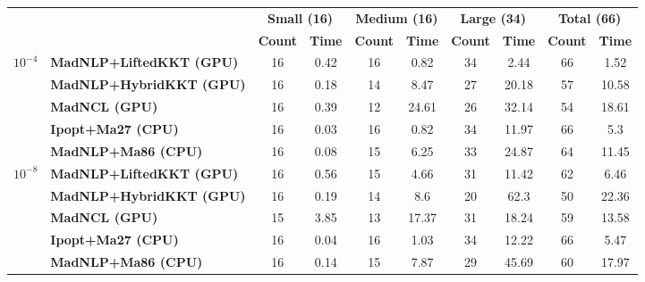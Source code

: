 \begin{center}
\renewcommand{\arraystretch}{0.9}
\begin{tabular}{|l|l|cc|cc|cc|cc|}
\hline
 & & \multicolumn{2}{c|}{\textbf{Small (16)}} & \multicolumn{2}{c|}{\textbf{Medium (16)}} & \multicolumn{2}{c|}{\textbf{Large (34)}} & \multicolumn{2}{c|}{\textbf{Total (66)}} \\
 & & \textbf{Count} & \textbf{Time} & \textbf{Count} & \textbf{Time} & \textbf{Count} & \textbf{Time} & \textbf{Count} & \textbf{Time} \\
\hline
\multirow{5}{*}{\Large\textbf{$10^{-4}$}} & \textbf{MadNLP+LiftedKKT (GPU)} & \cellcolor{blue!15}16 & 0.42 & \cellcolor{blue!15}16 & \cellcolor{blue!15}0.82 & \cellcolor{blue!15}34 & \cellcolor{blue!15}2.44 & \cellcolor{blue!15}66 & \cellcolor{blue!15}1.52 \\
 & \textbf{MadNLP+HybridKKT (GPU)} & \cellcolor{blue!15}16 & 0.18 & 14 & 8.47 & 27 & 20.18 & 57 & 10.58 \\
 & \textbf{MadNCL (GPU)} & \cellcolor{blue!15}16 & 0.39 & 12 & 24.61 & 26 & 32.14 & 54 & 18.61 \\
 & \textbf{Ipopt+Ma27 (CPU)} & \cellcolor{blue!15}16 & \cellcolor{blue!15}0.03 & \cellcolor{blue!15}16 & 0.82 & \cellcolor{blue!15}34 & 11.97 & \cellcolor{blue!15}66 & 5.3 \\
 & \textbf{MadNLP+Ma86 (CPU)} & \cellcolor{blue!15}16 & 0.08 & 15 & 6.25 & 33 & 24.87 & 64 & 11.45 \\
\hline
\multirow{5}{*}{\Large\textbf{$10^{-8}$}} & \textbf{MadNLP+LiftedKKT (GPU)} & \cellcolor{blue!15}16 & 0.56 & 15 & 4.66 & 31 & \cellcolor{blue!15}11.42 & 62 & 6.46 \\
 & \textbf{MadNLP+HybridKKT (GPU)} & \cellcolor{blue!15}16 & 0.19 & 14 & 8.6 & 20 & 62.3 & 50 & 22.36 \\
 & \textbf{MadNCL (GPU)} & 15 & 3.85 & 13 & 17.37 & 31 & 18.24 & 59 & 13.58 \\
 & \textbf{Ipopt+Ma27 (CPU)} & \cellcolor{blue!15}16 & \cellcolor{blue!15}0.04 & \cellcolor{blue!15}16 & \cellcolor{blue!15}1.03 & \cellcolor{blue!15}34 & 12.22 & \cellcolor{blue!15}66 & \cellcolor{blue!15}5.47 \\
 & \textbf{MadNLP+Ma86 (CPU)} & \cellcolor{blue!15}16 & 0.14 & 15 & 7.87 & 29 & 45.69 & 60 & 17.97 \\
\hline
\end{tabular}
\end{center}
